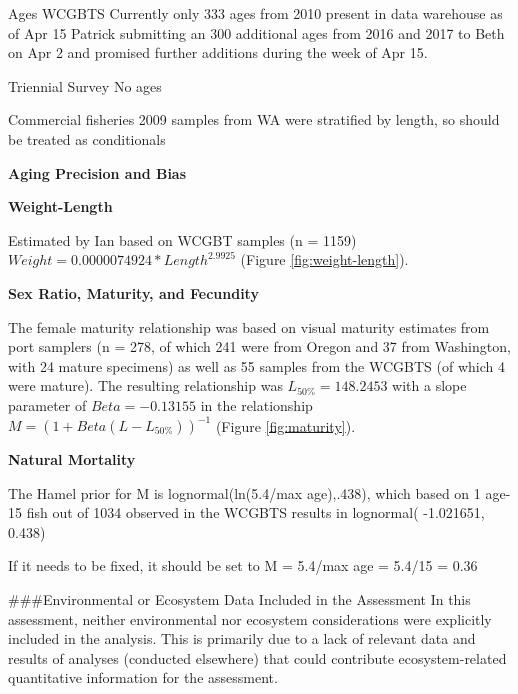 \documentclass[12pt,]{article}
\begin{document}
Ages WCGBTS Currently only 333 ages from 2010 present in data warehouse
as of Apr 15 Patrick submitting an 300 additional ages from 2016 and
2017 to Beth on Apr 2 and promised further additions during the week of
Apr 15.

Triennial Survey No ages

Commercial fisheries 2009 samples from WA were stratified by length, so
should be treated as conditionals

\vspace{.5cm}

\textbf{Aging Precision and Bias}

\vspace{.5cm}

\textbf{Weight-Length}

Estimated by Ian based on WCGBT samples (n = 1159)
\(Weight = 0.0000074924 * Length ^ 2.9925\) (Figure
\ref{fig:weight-length}).

\vspace{.5cm}

\textbf{Sex Ratio, Maturity, and Fecundity}

The female maturity relationship was based on visual maturity estimates
from port samplers (n = 278, of which 241 were from Oregon and 37 from
Washington, with 24 mature specimens) as well as 55 samples from the
WCGBTS (of which 4 were mature). The resulting relationship was
\(L_{50\%} = 148.2453\) with a slope parameter of \(Beta = -0.13155\) in
the relationship \(M = (1 + Beta(L - L_{50\%}))^{-1}\) (Figure
\ref{fig:maturity}).

\vspace{.5cm}

\textbf{Natural Mortality}

The Hamel prior for M is lognormal(ln(5.4/max age),.438), which based on
1 age-15 fish out of 1034 observed in the WCGBTS results in lognormal(
-1.021651, 0.438)

If it needs to be fixed, it should be set to M = 5.4/max age = 5.4/15 =
0.36

\vspace{.5cm}

\#\#\#Environmental or Ecosystem Data Included in the Assessment In this
assessment, neither environmental nor ecosystem considerations were
explicitly included in the analysis. This is primarily due to a lack of
relevant data and results of analyses (conducted elsewhere) that could
contribute ecosystem-related quantitative information for the
assessment.
\end{document}
